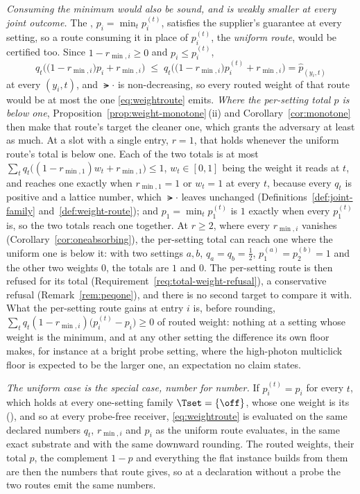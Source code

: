 \begin{remark}
\emph{Consuming the minimum would also be sound, and is weakly smaller at
every joint outcome.} The ,
$p_i=\min_tp^{(t)}_i$, satisfies the supplier's guarantee at every setting, so
a route consuming it in place of $p^{(t)}_i$, the \emph{uniform route}, would
be certified too. Since
$1-r_{\min,i}\ge0$ and $p_i\le p^{(t)}_i$,
\begin{equation*}
  q_t\Big(\big(1-r_{\min,i}\big)p_i+r_{\min,i}\Big)
  \;\le\;
  q_t\Big(\big(1-r_{\min,i}\big)p^{(t)}_i+r_{\min,i}\Big)=\hat p_{(y_i,t)}
\end{equation*}
at every $(y_i,t)$, and $\lat{\cdot}$ is non-decreasing, so every routed weight
of that route would be at most the one \eqref{eq:weightroute} emits.
\emph{Where the per-setting total $p$ is below one},
Proposition~\ref{prop:weight-monotone}\,(ii) and Corollary~\ref{cor:monotone} then
make that route's target the cleaner one, which grants the adversary at least
as much. At a slot with a single entry, $r=1$, that holds whenever the
uniform route's total is below one. Each of the two totals is at most
$\sum_tq_t\big((1-r_{\min,1})w_t+r_{\min,1}\big)\le1$, $w_t\in[0,1]$ being the
weight it reads at $t$, and reaches one exactly when $r_{\min,1}=1$ or $w_t=1$
at every $t$, because every $q_t$ is positive and a lattice number, which
$\lat{\cdot}$ leaves unchanged (Definitions~\ref{def:joint-family}
and~\ref{def:weight-route}); and $p_1=\min_tp^{(t)}_1$ is $1$ exactly when
every $p^{(t)}_1$ is, so the two totals reach one together. At $r\ge2$, where
every $r_{\min,i}$ vanishes (Corollary~\ref{cor:oneabsorbing}), the
per-setting total can reach one where the uniform one is below it: with two
settings $a,b$, $q_a=q_b=\tfrac12$, $p^{(a)}_1=p^{(b)}_2=1$ and the other two
weights $0$, the totals are $1$ and $0$. The per-setting route is then refused
for its total (Requirement~\ref{req:total-weight-refusal}), a conservative
refusal (Remark~\ref{rem:peqone}), and there is no second target to compare it
with. What the per-setting route gains at entry $i$ is, before rounding,
$\sum_tq_t(1-r_{\min,i})\big(p^{(t)}_i-p_i\big)\ge0$ of routed weight: nothing
at a setting whose weight is the minimum, and at any other setting the
difference its own floor makes, for instance at a bright probe setting, where
the high-photon multiclick floor is expected to be the larger one, an
expectation no claim states.

\emph{The uniform case is the special case, number for number.} If
$p^{(t)}_i=p_i$ for every $t$, which holds at every one-setting family
$\Tset=\{\off\}$, whose one weight is its
 (),
and so at every probe-free receiver, \eqref{eq:weightroute} is evaluated on
the same declared numbers $q_t$, $r_{\min,i}$ and $p_i$ as the uniform route
evaluates, in the same exact substrate and with the same downward rounding. The routed weights,
their total $p$, the complement $1-p$ and everything the flat instance builds
from them are then the numbers that route gives, so at a declaration without
a probe the two routes emit the same numbers.
\end{remark}
